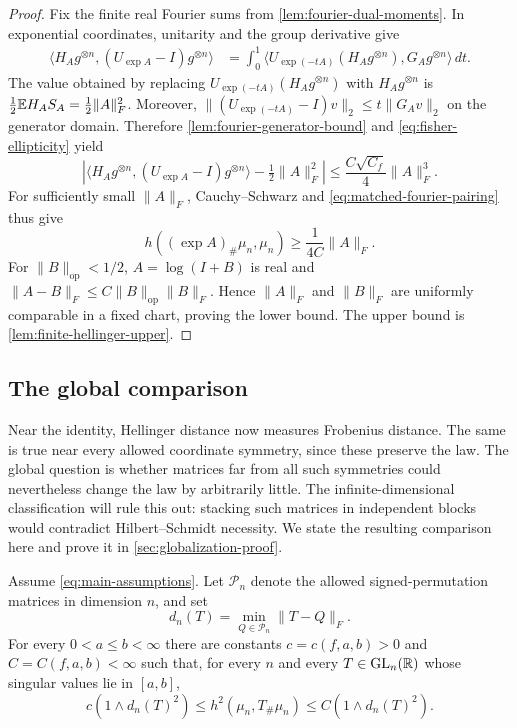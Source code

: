 \begin{proof}
Fix the finite real Fourier sums from \cref{lem:fourier-dual-moments}.
In exponential coordinates, unitarity and the group derivative give
\begin{align*}
 \langle H_Ag^{\otimes n},(U_{\exp A}-I)g^{\otimes n}\rangle
 &=\int_0^1
 \langle U_{\exp(-tA)}(H_Ag^{\otimes n}),G_Ag^{\otimes n}\rangle\,dt.
\end{align*}
The value obtained by replacing $U_{\exp(-tA)}(H_Ag^{\otimes n})$ with
$H_Ag^{\otimes n}$ is $\frac12\mathbb E H_AS_A=\frac12\|A\|_F^2$.  Moreover,
$\|(U_{\exp(-tA)}-I)v\|_2\le t\|G_Av\|_2$ on the generator domain.
Therefore \cref{lem:fourier-generator-bound} and
\eqref{eq:fisher-ellipticity} yield
\[
 \left|\langle H_Ag^{\otimes n},(U_{\exp A}-I)g^{\otimes n}\rangle
                       -\tfrac12\|A\|_F^2\right|
 \le\frac{C\sqrt{C_f}}4\|A\|_F^3.
\]
For sufficiently small $\|A\|_F$, Cauchy--Schwarz and
\eqref{eq:matched-fourier-pairing} thus give
\[
 h((\exp A)_\#\mu_n,\mu_n)
 \ge\frac{1}{4C}\|A\|_F.
\]
For \(\|B\|_{\mathrm{op}}<1/2\), \(A=\log(I+B)\) is real and
\(\|A-B\|_F\le C\|B\|_{\mathrm{op}}\|B\|_F\).  Hence \(\|A\|_F\) and
\(\|B\|_F\) are uniformly comparable in a fixed chart, proving the lower
bound.  The upper bound is
\cref{lem:finite-hellinger-upper}.
\end{proof}

\subsection{The global comparison}

Near the identity, Hellinger distance now measures Frobenius distance. The
same is true near every allowed coordinate symmetry, since these preserve
the law. The global question is whether matrices far from all such
symmetries could nevertheless change the law by arbitrarily little.
The infinite-dimensional classification will rule this out: stacking such
matrices in independent blocks would contradict Hilbert--Schmidt necessity.
We state the resulting comparison here and prove it in
\cref{sec:globalization-proof}.

\begin{theorem}
\label{thm:global-coercivity}
Assume \eqref{eq:main-assumptions}.  Let \(\mathcal P_n\) denote the allowed
signed-permutation matrices in dimension \(n\), and set
\begin{equation}
 d_n(T)=\min_{Q\in\mathcal P_n}\|T-Q\|_F.
\end{equation}
For every \(0<a\le b<\infty\)
there are constants \(c=c(f,a,b)>0\) and \(C=C(f,a,b)<\infty\) such
that, for every \(n\) and every \(T\in\operatorname{GL}_n(\mathbb R)\) whose singular
values lie in \([a,b]\),
\begin{equation}
 c(1\wedge d_n(T)^2)
 \le h^2(\mu_n,T_\#\mu_n)
 \le C(1\wedge d_n(T)^2).
 \label{eq:global-coercivity}
\end{equation}
\end{theorem}
